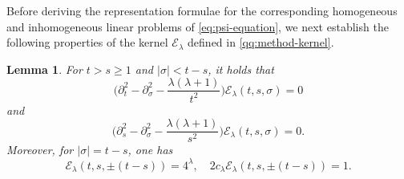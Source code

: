 \documentclass[11pt,twoside]{article}
\newcommand{\p}{\partial}
\newcommand{\f}{\frac}
\newcommand{\Ecal}{\mathcal E}
\theoremstyle{plain}
\newtheorem{lemma}[theorem]{Lemma}
\theoremstyle{definition}
\theoremstyle{remark}
\numberwithin{equation}{section}
\begin{document}
Before deriving the representation formulae for the corresponding homogeneous and
inhomogeneous linear problems of \eqref{eq:psi-equation}, we next establish the following
properties of the kernel $\Ecal_\lambda$ defined in \eqref{qq:method-kernel}.


\begin{lemma}
\label{lem:kernel-equation}
For $t>s\geq1$ and $|\sigma|<t-s$, it holds that
\begin{equation}
\label{eq:kernel-t}
\big(
\p_t^2-\p_\sigma^2-\f{\lambda(\lambda+1)}{t^2}
\big)
\Ecal_\lambda(t,s,\sigma)=0
\end{equation}
and
\begin{equation}
\label{eq:kernel-s}
\big(
\p_s^2-\p_\sigma^2-\f{\lambda(\lambda+1)}{s^2}
\big)
\Ecal_\lambda(t,s,\sigma)=0.
\end{equation}
Moreover, for $|\sigma|=t-s$, one has
\begin{equation}
\label{eq:kernel-characteristic}
\Ecal_\lambda(t,s,\pm(t-s))=4^\lambda,
\quad
2c_\lambda\Ecal_\lambda(t,s,\pm(t-s))=1.
\end{equation}
\end{lemma}
\end{document}
